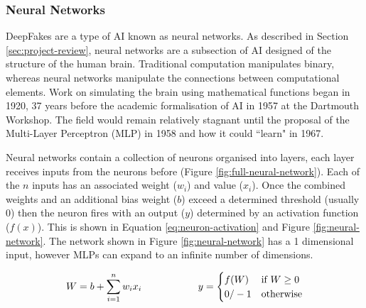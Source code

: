\subsubsection{Neural Networks}

DeepFakes are a type of AI known as neural networks. As described in Section \ref{sec:project-review}, neural networks are a subsection of AI designed of the structure of the human brain\cite{islam2019overview}. Traditional computation manipulates binary, whereas neural networks manipulate the connections between computational elements. Work on simulating the brain using mathematical functions began in 1920\cite{brush1967history}, 37 years before the academic formalisation of AI in 1957 at the Dartmouth Workshop\cite{crevier1993ai}. The field would remain relatively stagnant until the proposal of the Multi-Layer Perceptron (MLP) in 1958\cite{rosenblatt1958perceptron} and how it could ``learn" in 1967\cite{ivakhnenko1967cybernetics}.

Neural networks contain a collection of neurons organised into layers, each layer receives inputs from the neurons before (Figure \ref{fig:full-neural-network}). Each of the $n$ inputs has an associated weight ($w_i$) and value ($x_i$). Once the combined weights and an additional bias weight ($b$) exceed a determined threshold (usually 0) then the neuron fires with an output ($y$) determined by an activation function ($f(x)$). This is shown in Equation \ref{eq:neuron-activation} and Figure \ref{fig:neural-network}. The network shown in Figure \ref{fig:neural-network} has a 1 dimensional input, however MLPs can expand to an infinite number of dimensions.

\begin{equation}
\label{eq:neuron-activation}
    \begin{array}{c@{\hspace{2cm}}c}
        W = b+\displaystyle\sum_{i=1}^{n} w_ix_i  &
        y = \begin{cases}
            f(W) & \text{if } W \geq 0  \\
            0/-1 & \text{otherwise}
        \end{cases}
    \end{array}
\end{equation}

